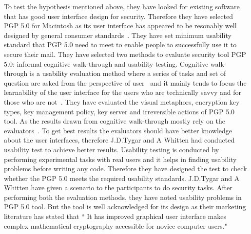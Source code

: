   To test the hypothesis mentioned above, they have looked for existing software that has good user interface design for security. Therefore they have selected PGP 5.0 for Macintosh as its user interface has appeared to be resonably well designed by general consumer standards~\cite{whitten1999johnny}. They have set minimum usability standard that PGP 5.0 need to meet to enable people to successfully use it to secure their mail.  They have selected two methods to evaluate security tool PGP 5.0: informal cognitive walk-through and usability testing. Cognitive walk-through is a usability evaluation method where a series of tasks and set of question are asked from the perspective of user~\cite[p.84]{baecker2014readings}  and it mainly tends to focus the learnability of the user interface for the users who are technically savvy and for those who are not~\cite{whitten1999johnny}. They have evaluated the visual metaphors, encryption key types, key management policy, key server and irreversible actions of PGP 5.0 tool. As the results drawn from cognitive walk-through mostly rely on the evaluators~\cite[p.84]{baecker2014readings}. To get best results the evaluators should have better knowledge about the user interfaces, therefore J.D.Tygar and A Whitten had conducted usability test to achieve better results. Usability testing is conducted by performing experimental tasks with real users and it helps in finding usability problems before writing any code. Therefore they have designed the test to check whether the PGP 5.0 meets the required usability standards. J.D.Tygar and A Whitten have given a scenario to the participants to do security tasks. After performing both the evaluation methods, they have noted usability problems in PGP 5.0 tool. But the tool is well acknowledged for its design as their marketing literature has stated that `` It has improved graphical user interface makes complex mathematical cryptography accessible for novice computer users."~\cite{whitten1999johnny} \\
  
